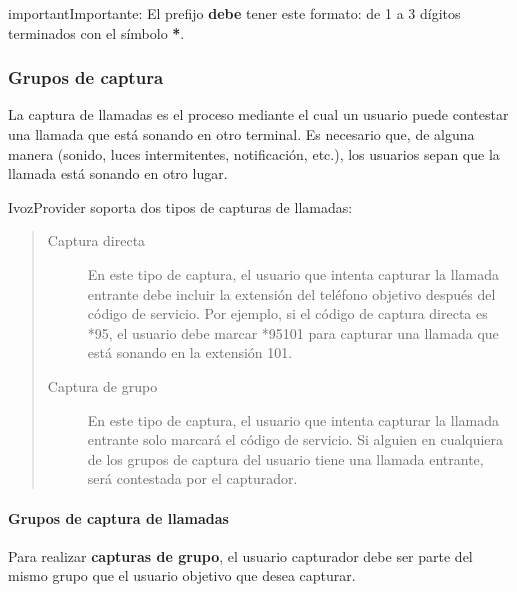 \documentclass[letterpaper,10pt,spanish]{sphinxmanual}
\begin{document}
\begin{notice}{important}{Importante:}
El prefijo \textbf{debe} tener este formato: de 1 a 3 dígitos terminados con el símbolo {\color{red}\bfseries{}*}.
\end{notice}


\subsubsection{Grupos de captura}
\label{administration_portal/client/vpbx/user_configuration/pick_up_groups:capture-groups}\label{administration_portal/client/vpbx/user_configuration/pick_up_groups:pick-up-groups}\label{administration_portal/client/vpbx/user_configuration/pick_up_groups::doc}
La captura de llamadas es el proceso mediante el cual un usuario puede contestar una llamada que está sonando en otro terminal. Es necesario que, de alguna manera (sonido, luces intermitentes, notificación, etc.), los usuarios sepan que la llamada está sonando en otro lugar.

IvozProvider soporta dos tipos de capturas de llamadas:
\begin{quote}
\begin{description}
\item[{Captura directa}] \leavevmode
En este tipo de captura, el usuario que intenta capturar la llamada entrante debe incluir la extensión del teléfono objetivo después del código de servicio. Por ejemplo, si el código de captura directa es *95, el usuario debe marcar *95101 para capturar una llamada que está sonando en la extensión 101.

\item[{Captura de grupo}] \leavevmode
En este tipo de captura, el usuario que intenta capturar la llamada entrante solo marcará el código de servicio. Si alguien en cualquiera de los grupos de captura del usuario tiene una llamada entrante, será contestada por el capturador.

\end{description}
\end{quote}


\paragraph{Grupos de captura de llamadas}
\label{administration_portal/client/vpbx/user_configuration/pick_up_groups:call-pickup-groups}
Para realizar \textbf{capturas de grupo}, el usuario capturador debe ser parte del mismo grupo que el usuario objetivo que desea capturar.
\end{document}
